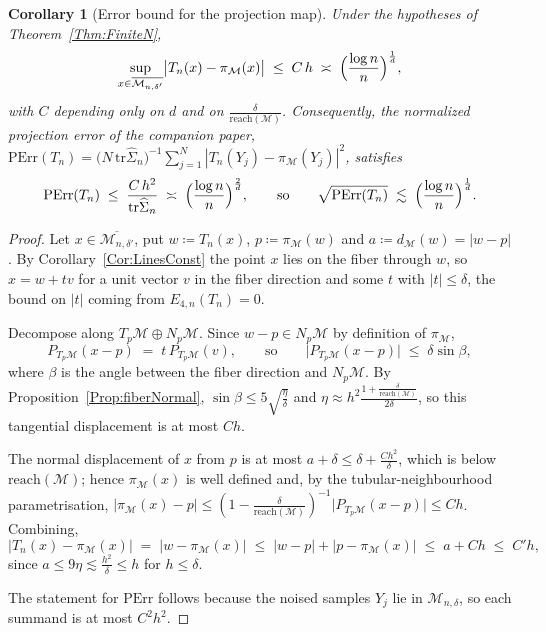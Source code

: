 \documentclass[11pt]{amsart}%
\theoremstyle{plain}
\newtheorem{corollary}[definition]{Corollary}
\newcommand{\1}{\mathbf{1}}
\newcommand{\M}{\mathcal{M}}
\begin{document}
\begin{corollary}[Error bound for the projection map]
    \label{Cor:PErr}
    Under the hypotheses of Theorem~\ref{Thm:FiniteN},
    \[
        \sup_{x\in\overline{\M_{n,\delta'}}}\bigl|T_n(x)-\pi_\M(x)\bigr|
        \;\le\;C\,h\;\asymp\;\Bigl(\frac{\log n}{n}\Bigr)^{\frac{1}{d}},
    \]
    with $C$ depending only on $d$ and on $\frac{\delta}{\mathrm{reach}(\M)}$. Consequently, the normalized
    projection error of the companion paper, $\mathrm{PErr}(T_n)=\bigl(N\,\mathrm{tr}\widehat\Sigma_n\bigr)^{-1}\sum_{j=1}^N|T_n(Y_j)-\pi_\M(Y_j)|^2$,
    satisfies
    \[
        \mathrm{PErr}(T_n)\;\le\;\frac{C\,h^2}{\mathrm{tr}\widehat\Sigma_n}
        \;\asymp\;\Bigl(\frac{\log n}{n}\Bigr)^{\frac{2}{d}},
        \qquad\text{so}\qquad
        \sqrt{\mathrm{PErr}(T_n)}\;\lesssim\;\Bigl(\frac{\log n}{n}\Bigr)^{\frac{1}{d}}.
    \]
\end{corollary}

\begin{proof}
    Let $x\in\overline{\M_{n,\delta'}}$, put $w\coloneqq T_n(x)$, $p\coloneqq\pi_\M(w)$ and
    $a\coloneqq d_\M(w)=|w-p|$. By Corollary~\ref{Cor:LinesConst} the point $x$ lies on the fiber
    through $w$, so $x=w+tv$ for a unit vector $v$ in the fiber direction and some $t$ with
    $|t|\le\delta$, the bound on $|t|$ coming from $E_{4,n}(T_n)=0$.

    Decompose along $T_p\M\oplus N_p\M$. Since $w-p\in N_p\M$ by definition of $\pi_\M$,
    \[
        P_{T_p\M}(x-p)\;=\;t\,P_{T_p\M}(v),
        \qquad\text{so}\qquad
        \bigl|P_{T_p\M}(x-p)\bigr|\;\le\;\delta\sin\beta ,
    \]
    where $\beta$ is the angle between the fiber direction and $N_p\M$. By
    Proposition~\ref{Prop:fiberNormal}, $\sin\beta\le 5\sqrt{\frac{\eta}{\delta}}$ and
    $\eta\approx h^2\frac{1+\frac{\delta}{\mathrm{reach}(\M)}}{2\delta}$, so this tangential displacement is at
    most $C h$.

    The normal displacement of $x$ from $p$ is at most $a+\delta\le\delta+\frac{Ch^2}{\delta}$, which is
    below $\mathrm{reach}(\M)$; hence $\pi_\M(x)$ is well defined and, by the tubular-neighbourhood
    parametrisation, $|\pi_\M(x)-p|\le\left(1-\frac{\delta}{\mathrm{reach}(\M)}\right)^{-1}
    \bigl|P_{T_p\M}(x-p)\bigr|\le C h$. Combining,
    \[
        \bigl|T_n(x)-\pi_\M(x)\bigr|\;=\;|w-\pi_\M(x)|\;\le\;|w-p|+|p-\pi_\M(x)|
        \;\le\;a+Ch\;\le\;C'h ,
    \]
    since $a\le 9\eta\lesssim \frac{h^2}{\delta}\le h$ for $h\le\delta$.

    The statement for $\mathrm{PErr}$ follows because the noised samples $Y_j$ lie in
    $\M_{n,\delta}$, so each summand is at most $C^2h^2$.
\end{proof}
\end{document}
